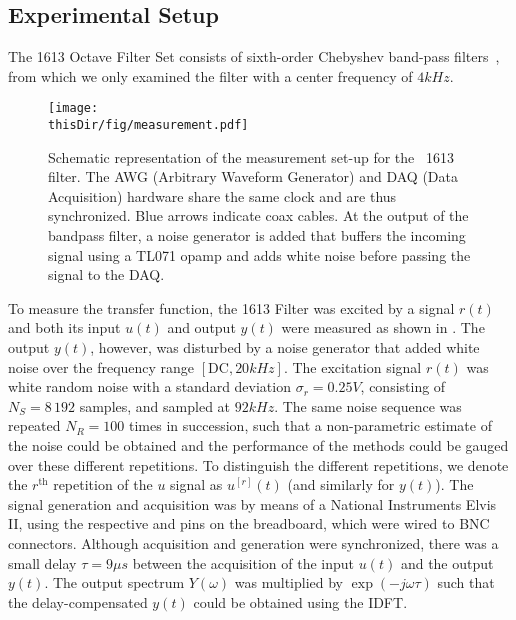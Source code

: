 \subsection{Experimental Setup}
The \BK{} 1613 Octave Filter Set consists of sixth-order Chebyshev band-pass filters~\citep{datasheet_bk1613}, from which we only examined the filter with a center frequency of $4\unit{kHz}$.

\begin{figure}
  \centering
  \texttt{[image: \\thisDir/fig/measurement.pdf]}
  \caption[Measurement schematic of \BK\ 1613 filter.]{Schematic representation of the measurement set-up for the \BK\ 1613 filter. The AWG (Arbitrary Waveform Generator) and DAQ (Data Acquisition) hardware share the same clock and are thus synchronized. 
  Blue arrows indicate coax cables. 
  At the output of the bandpass filter, a noise generator is added that buffers the incoming signal using a TL071 opamp and adds white noise before passing the signal to the DAQ.} 
  \label{fig:measurementSetup}
\end{figure}


To measure the transfer function, the \BK{} 1613 Filter was excited by a signal $r(t)$ and both its input $u(t)$ and output $y(t)$ were measured as shown in .
The output $y(t)$, however, was disturbed by a noise generator that added white noise over the frequency range $[\mathrm{DC}, 20\unit{kHz}]$.
The excitation signal $r(t)$ was white random noise with a standard deviation $\sigma_r = 0.25 \unit{V}$, consisting of $N_S = 8\,192$ samples, and sampled at $92 \unit{kHz}$.
The same noise sequence was repeated $N_R = 100$ times in succession, such that a non-parametric estimate of the noise could be obtained and the performance of the methods could be gauged over these different repetitions.
To distinguish the different repetitions, we denote the $r^{\text{th}}$ repetition of the $u$ signal as $u^{[r]}(t)$ (and similarly for $y(t)$).
The signal generation and acquisition was by means of a National Instruments Elvis II, using the respective  and  pins on the breadboard, which were wired to BNC connectors.
Although acquisition and generation were synchronized, there was a small delay $\tau = 9\unit{\mu s}$ between the acquisition of the input $u(t)$ and the output $y(t)$.
The output spectrum $Y(\omega)$ was multiplied by $\exp\left(-j\omega\tau \right)$ such that the delay-compensated $y(t)$ could be obtained using the \gls{IDFT}.

